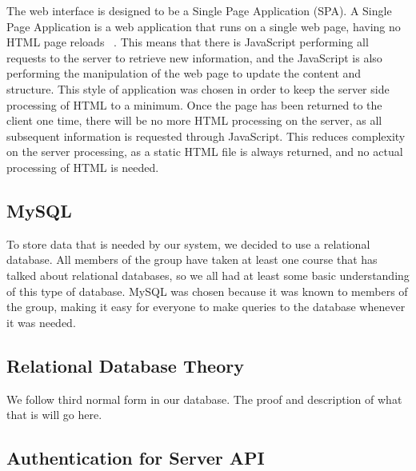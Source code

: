 \documentclass[12pt]{report}
\let\Oldsubsection\subsection
\renewcommand{\subsection}{\FloatBarrier\Oldsubsection}
\begin{document}

The web interface is designed to be a Single Page Application (SPA). A Single Page Application is
a web application that runs on a single web page, having no HTML page reloads ~\autocite{SPAREF}. This means
that there is JavaScript performing all requests to the server to retrieve new information, and the
JavaScript is also performing the manipulation of the web page to update the content and structure.
This style of application was chosen in order to keep the server side processing of HTML to a minimum.
Once the page has been returned to the client one time, there will be no more HTML processing on the
server, as all subsequent information is requested through JavaScript. This reduces complexity on the
server processing, as a static HTML file is always returned, and no actual processing of HTML is needed.

\subsection{MySQL} \label{mysql}

To store data that is needed by our system, we decided to use a relational database. All
members of the group have taken at least one course that has talked about relational databases, so
we all had at least some basic understanding of this type of database. MySQL was chosen
because it was known to members of the group, making it easy for everyone to make queries to
the database whenever it was needed.

\subsection{Relational Database Theory} \label{relational-database-theory}

We follow third normal form in our database. The proof and description of what that is will go here.

\subsection{Authentication for Server API} \label{authentication-for-server-api}

\end{document}
